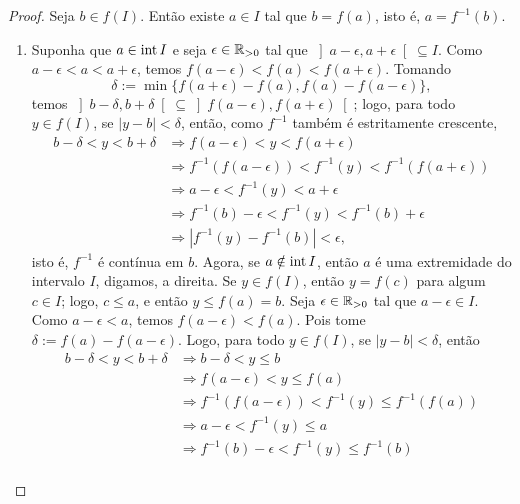 \begin{proof}
    Seja $b \in f(I)$. Então existe $a \in I$ tal que $b = f(a)$, isto é, $a = f^{-1}(b)$.
        \begin{enumerate}[leftmargin=*, align=left, label=\textbf{(\alph*)}]
            \item Suponha que $a \in \operatorname{int} I$ e seja $\epsilon \in \mathbb{R}_{>0}$ tal que $\left]a-\epsilon,a+\epsilon \right[ \subseteq I$. Como $a-\epsilon < a < a+\epsilon$, temos $f(a-\epsilon) < f(a) < f(a+\epsilon)$. Tomando
                \[
                    \delta := \min \{f(a+\epsilon) - f(a), f(a) - f(a - \epsilon)\},
                \]
            temos $\left]b-\delta, b+\delta \right[ \subseteq \left]f(a - \epsilon), f(a+\epsilon) \right[$; logo, para todo $y \in f(I)$, se $|y-b| < \delta$, então, como $f^{-1}$ também é estritamente crescente,
                \begin{align*}
                    b - \delta < y < b + \delta &\Rightarrow f(a-\epsilon) < y < f(a + \epsilon) \\
                    &\Rightarrow f^{-1}(f(a-\epsilon)) < f^{-1}(y) < f^{-1}(f(a+\epsilon)) \\
                    &\Rightarrow a - \epsilon < f^{-1}(y) < a + \epsilon \\
                    &\Rightarrow f^{-1}(b) - \epsilon < f^{-1}(y) < f^{-1}(b) + \epsilon \\
                    &\Rightarrow |f^{-1}(y) - f^{-1}(b)| < \epsilon,
                \end{align*}
            isto é, $f^{-1}$ é contínua em $b$. Agora, se $a \notin \operatorname{int} I$, então $a$ é uma extremidade do intervalo $I$, digamos, a direita. Se $y \in f(I)$, então $y=f(c)$ para algum $c \in I$; logo, $c \leq a$, e então $y \leq f(a) = b$. Seja $\epsilon \in \mathbb{R}_{>0}$ tal que $a-\epsilon \in I$. Como $a-\epsilon < a$, temos $f(a-\epsilon) < f(a)$. Pois tome $\delta := f(a) - f(a-\epsilon)$. Logo, para todo $y \in f(I)$, se $|y-b| < \delta$, então
                \begin{align*}
                    b - \delta < y < b + \delta &\Rightarrow b- \delta < y \leq b \\
                    &\Rightarrow f(a-\epsilon) < y \leq f(a) \\
                    &\Rightarrow f^{-1}(f(a-\epsilon)) < f^{-1}(y) \leq f^{-1}(f(a)) \\
                    &\Rightarrow a - \epsilon < f^{-1}(y) \leq a \\
                    &\Rightarrow f^{-1}(b) - \epsilon < f^{-1}(y) \leq f^{-1}(b) \\

\end{align*}
\end{enumerate}
\end{proof}
